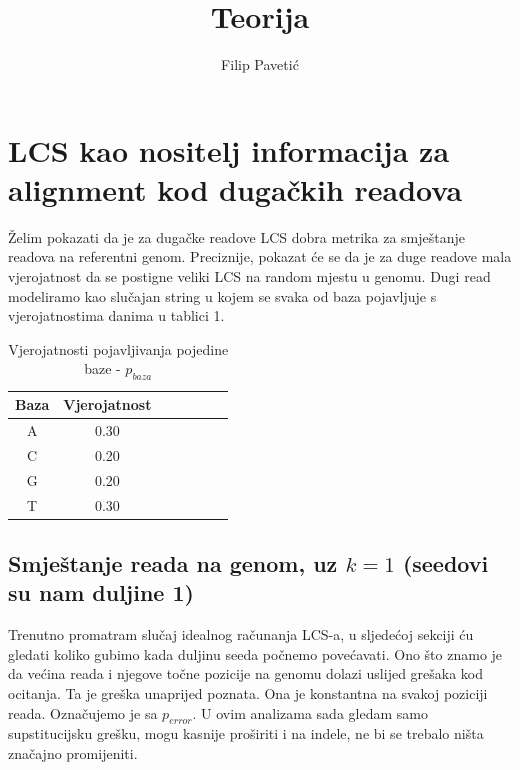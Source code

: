 \documentclass[11pt]{article} %
\title{Teorija}
\author{Filip Paveti\'{c}}
\begin{document}
\maketitle

\section{LCS kao nositelj informacija za alignment kod duga\v{c}kih readova}

\v{Z}elim pokazati da je za duga\v{c}ke readove LCS dobra metrika za smje\v{s}tanje readova na referentni genom. Preciznije, pokazat \'{c}e se da je za duge readove mala vjerojatnost da se postigne veliki LCS na random mjestu u genomu. Dugi read modeliramo kao slu\v{c}ajan string u kojem se svaka od baza pojavljuje s vjerojatnostima danima u tablici 1.

\begin{table}[H]
\centering
\begin{tabular}{|c||c|c|c|c|c|c|}
\hline
	Baza & Vjerojatnost\\
\hline
\hline
	A & 0.30\\
\hline
	C & 0.20\\
\hline
	G & 0.20\\
\hline
	T & 0.30\\
\hline
\end{tabular}
\caption{Vjerojatnosti pojavljivanja pojedine baze - $p_{baza}$}
\end{table}

\subsection{Smje\v{s}tanje reada na genom, uz $k=1$ (seedovi su nam duljine 1)}

Trenutno promatram slu\v{c}aj idealnog ra\v{c}unanja LCS-a, u sljede\'{c}oj sekciji \'{c}u gledati koliko gubimo kada duljinu seeda po\v{c}nemo pove\'{c}avati. Ono \v{s}to znamo je da ve\'{c}ina reada i njegove to\v{c}ne pozicije na genomu dolazi uslijed gre\v{s}aka kod ocitanja. Ta je gre\v{s}ka unaprijed poznata. Ona je konstantna na svakoj poziciji reada. Ozna\v{c}ujemo je sa $p_{error}$. U ovim analizama sada gledam samo supstitucijsku gre\v{s}ku, mogu kasnije pro\v{s}iriti i na indele, ne bi se trebalo ni\v{s}ta zna\v{c}ajno promijeniti.
\end{document}
